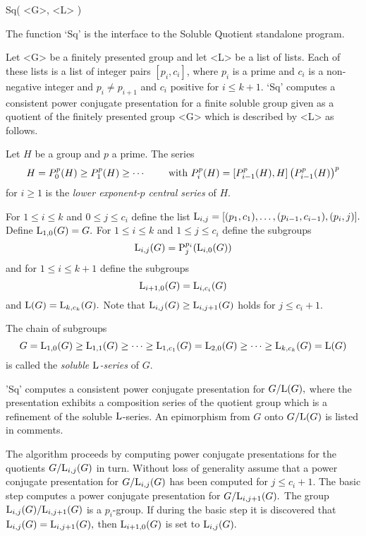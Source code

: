 
\>Sq( <G>, <L> )

The function  `Sq' is  the  interface to the  Soluble Quotient standalone
program.

Let <G> be  a finitely presented group  and let <L> be  a list  of lists.
Each of these lists is a list of integer pairs $[p_i,c_i]$, where $p_i$
is  a prime and  $c_i$ is a  non-negative integer and $p_i \not= p_{i+1}$
and $c_i$ positive for  $i\le k+1$. 
`Sq' computes a  consistent
power conjugate   presentation  for a  finite  soluble group  given  as a
quotient of the finitely presented group <G> which is described by <L> as
follows.

Let  $H$ be a  group and  $p$ a  prime.  The  series  $$H = {P}^p_0(H)\ge
{P}^p_1(H)\ge\cdots\,\,\hbox  to  1.5   cm{\hfil  with\ }    {P}^p_i(H) =
[{P}^p_{i-1}(H),H] \left({P}^p_{i-1} (H)\right)^p$$ for $i  \ge 1$ is the
{\it lower exponent-$p$ central series} of $H.$

For $1 \le i \le k$ and $0 \le j \le  c_i$ define the list ${\rm L}_{i,j}
=   [(p_1,c_1),\ldots,  (p_{i-1},c_{i-1}),(p_{i}, j)    ].$ Define  ${\rm
L}_{1,0}(G) = G.$ For $1  \le i \le  k$ and $1  \le j \le c_i$ define the
subgroups  $${\rm L}_{i,j}(G) =  {\rm  P}_{j}^{p_i}( {\rm L}_{i,0}(G) )$$
and for $1  \le i \le  k+1$ define the  subgroups $${\rm L}_{i+1,0}(G) = {\rm
L}_{i,c_i}(G)$$ and ${\rm L}(G)  = {\rm  L}_{k,c_k}(G).$ Note that  ${\rm
L}_{i,j}(G) \ge {\rm L}_{i,j+1}(G)$ holds for $j \le c_i+1.$

The chain of subgroups $$G  = {\rm L}_{1,0}(G)  \ge {\rm L}_{1,1}(G)  \ge
\cdots  \ge {\rm L}_{1,c_1}(G)    = {\rm L}_{2,0}(G)\ge \cdots   \ge {\rm
L}_{k,c_k}(G) = {\rm  L}(G)  $$   is   called  the  {\it  soluble   ${\rm
L}$-series} of $G.$

'Sq' computes  a  consistent  power  conjugate  presentation for  $G/{\rm
L}(G),$ where  the   presentation exhibits a  composition  series  of the
quotient group which is a refinement of the soluble ${\rm L}$-series.  An
epimorphism from $G$ onto $G/{\rm L}(G)$ is listed in comments.

The algorithm proceeds by computing power conjugate presentations for the
quotients  $G/{\rm L}_{i,j}(G)$ in   turn.   Without loss of   generality
assume that a  power conjugate presentation  for $G/{\rm L}_{i,j}(G)$ has
been computed  for $j \le c_i+1.$ The  basic step computes a  power conjugate
presentation for $G/{\rm L}_{i,j+1}(G).$ The group ${\rm L}_{i,j}(G)/{\rm
L}_{i,j+1}(G)$  is  a  $p_{i}$-group.   If  during  the  basic step it is
discovered that ${\rm  L}_{i,j}(G)   = {\rm L}_{i,j+1}(G),$  then   ${\rm
L}_{i+1,0}(G)$ is set to ${\rm L}_{i,j}(G).$

